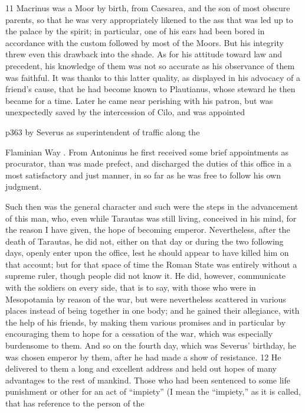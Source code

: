 11
Macrinus was a Moor by birth, from Caesarea, and the son of most obscure parents, so that he was very appropriately likened to the ass that was led up to the palace by the spirit; in particular, one of his ears had been bored in accordance with the custom followed by most of the Moors. But his integrity threw even this drawback into the shade. As for his attitude toward law and precedent, his knowledge of them was not so accurate as his observance of them was faithful. It was thanks to this latter quality, as displayed in his advocacy of a friend's cause, that he had become known to Plautianus, whose steward he then became for a time. Later he came near perishing with his patron, but was unexpectedly saved by the intercession of Cilo, and was appointed

p363 by Severus as superintendent of traffic along the

Flaminian Way . From Antoninus he first received some brief appointments as procurator, than was made prefect, and discharged the duties of this office in a most satisfactory and just manner, in so far as he was free to follow his own judgment.

Such then was the general character and such were the steps in the advancement of this man, who, even while Tarautas was still living, conceived in his mind, for the reason I have given, the hope of becoming emperor. Nevertheless, after the death of Tarautas, he did not, either on that day or during the two following days, openly enter upon the office, lest he should appear to have killed him on that account; but for that space of time the Roman State was entirely without a supreme ruler, though people did not know it. He did, however, communicate with the soldiers on every side, that is to say, with those who were in Mesopotamia by reason of the war, but were nevertheless scattered in various places instead of being together in one body; and he gained their allegiance, with the help of his friends, by making them various promises and in particular by encouraging them to hope for a cessation of the war, which was especially burdensome to them. And so on the fourth day, which was Severus' birthday, he was chosen emperor by them, after he had made a show of resistance. 12
He delivered to them a long and excellent address and held out hopes of many advantages to the rest of mankind. Those who had been sentenced to some life punishment or other for an act of ``impiety'' (I mean the ``impiety,'' as it is called, that has reference to the person of the

